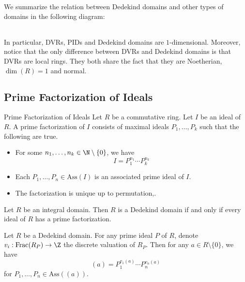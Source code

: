 \documentclass[a4paper]{article}
\begin{document}
We summarize the relation between Dedekind domains and other types of domains in the following diagram: 

 \\

In particular, DVRs, PIDs and Dedekind domains are $1$-dimensional. Moreover, notice that the only difference between DVRs and Dedekind domains is that DVRs are local rings. They both share the fact that they are Noetherian, $\dim(R)=1$ and normal. 

\subsection{Prime Factorization of Ideals}
\begin{defn}{Prime Factorization of Ideals}{} Let $R$ be a commutative ring. Let $I$ be an ideal of $R$. A prime factorization of $I$ consists of maximal ideals $P_1,\dots,P_k$ such that the following are true. 
\begin{itemize}
\item For some $n_1,\dots,n_k\in\N\setminus\{0\}$, we have $$I=P_1^{n_1}\cdots P_k^{n_k}$$
\item Each $P_1,\dots,P_n\in\text{Ass}(I)$ is an associated prime ideal of $I$. 
\item The factorization is unique up to permutation,. 
\end{itemize}
\end{defn}

\begin{prp}{}{} Let $R$ be an integral domain. Then $R$ is a Dedekind domain if and only if every ideal of $R$ has a prime factorization. 
\end{prp}

\begin{prp}{}{} Let $R$ be a Dedekind domain. For any prime ideal $P$ of $R$, denote $v_i:\text{Frac}(R_P)\to\Z$ the discrete valuation of $R_P$. Then for any $a\in R\setminus\{0\}$, we have $$(a)=P_1^{v_1(a)}\cdots P_n^{v_n(a)}$$ for $P_1,\dots,P_n\in\text{Ass}((a))$. 
\end{prp}
\end{document}
